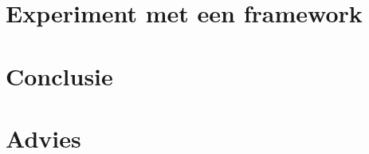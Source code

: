 \section{Experiment met een framework}\label{subsec:ch5-experiment-met-een-framework}

\section{Conclusie}\label{subsec:ch5-conclusie}


\section{Advies}\label{subsec:ch5-advies}




